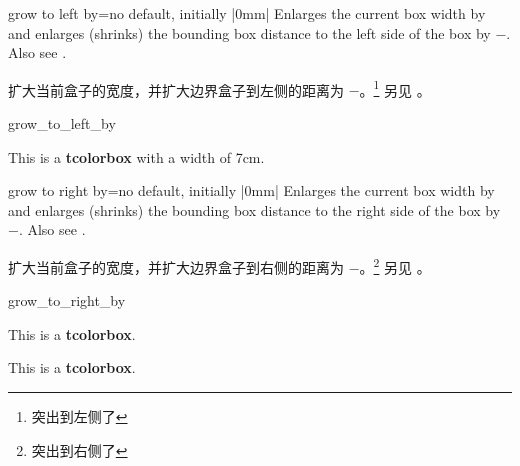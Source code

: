 \begin{docTcbKey}{grow to left by}{=}{no default, initially |0mm|}
Enlarges the current box width by  and
enlarges (shrinks) the bounding box distance to the left side of the box by
$-$. Also see .

扩大当前盒子的宽度，并扩大边界盒子到左侧的距离为
$-$。\footnote{突出到左侧了} 另见 。
\begin{exdispExample}[safety=2cm]{grow_to_left_by}

\begin{tcolorbox}[width=5cm,grow to left by=2cm,enhanced,show bounding box]
This is a \textbf{tcolorbox} with a width of 7cm.
\end{tcolorbox}
\end{exdispExample}
\end{docTcbKey}

\begin{docTcbKey}{grow to right by}{=}{no default, initially |0mm|}
Enlarges the current box width by  and
enlarges (shrinks) the bounding box distance to the right side of the box by
$-$. Also see .

扩大当前盒子的宽度，并扩大边界盒子到右侧的距离为
$-$。\footnote{突出到右侧了} 另见 。
\begin{exdispExample}[safety=2cm]{grow_to_right_by}

\begin{tcolorbox}[grow to right by=2cm,enhanced,show bounding box]
This is a \textbf{tcolorbox}.
\end{tcolorbox}

\bigskip

\begin{tcolorbox}[grow to right by=2cm,grow to left by=1cm,
enhanced,show bounding box]
This is a \textbf{tcolorbox}.
\end{tcolorbox}
\end{exdispExample}
\end{docTcbKey}



